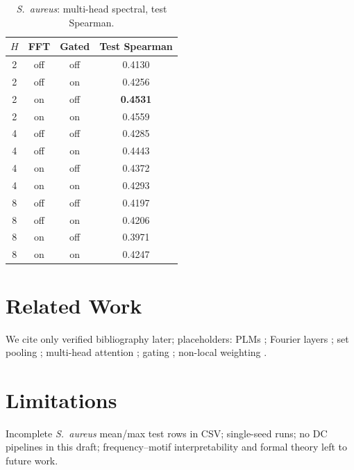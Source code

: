 \documentclass[11pt]{article}
\begin{document}
\begin{table}[h]
\centering
\caption{\textit{S.~aureus}: multi-head spectral, test Spearman.}
\begin{tabular}{ccc c}
\toprule
$H$ & FFT & Gated & Test Spearman \\
\midrule
2 & off & off & 0.4130 \\
2 & off & on & 0.4256 \\
2 & on & off & \textbf{0.4531} \\
2 & on & on & 0.4559 \\
4 & off & off & 0.4285 \\
4 & off & on & 0.4443 \\
4 & on & off & 0.4372 \\
4 & on & on & 0.4293 \\
8 & off & off & 0.4197 \\
8 & off & on & 0.4206 \\
8 & on & off & 0.3971 \\
8 & on & on & 0.4247 \\
\bottomrule
\end{tabular}
\end{table}

\section{Related Work}
We cite only verified bibliography later; placeholders: PLMs \cite{PLACEHOLDER_esm2}; Fourier layers \cite{PLACEHOLDER_fnet,PLACEHOLDER_afno,PLACEHOLDER_fedformer}; set pooling \cite{PLACEHOLDER_set_transformer,PLACEHOLDER_deep_sets}; multi-head attention \cite{PLACEHOLDER_transformer2017}; gating \cite{PLACEHOLDER_glu,PLACEHOLDER_senet}; non-local weighting \cite{PLACEHOLDER_nonlocal}.

\section{Limitations}
Incomplete \textit{S.~aureus} mean/max test rows in CSV; single-seed runs; no DC pipelines in this draft; frequency--motif interpretability and formal theory left to future work.
\end{document}
